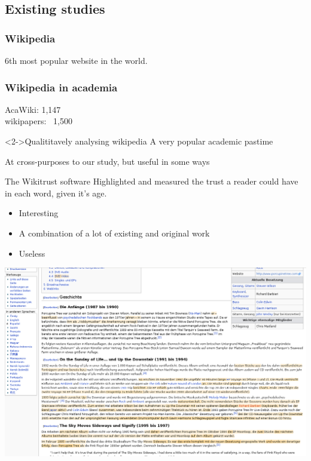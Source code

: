 \documentclass[t]{beamer}
\begin{document}
  \subsection{Existing studies}

  \begin{frame}
    \frametitle{Wikipedia} 

    6th most popular website in the world.\cite{Alexa-about2014}
  \end{frame}


  \begin{frame}
    \frametitle{Wikipedia in academia}
    AcaWiki: 1,147\\
    wikipapers: ~1,500
    
    \begin{block}<2->{Qualititavely analysing wikipedia}
      A very popular academic pastime

      At cross-purposes to our study, but useful in some ways

    \end{block}

  \end{frame}


  \begin{frame}{The Wikitrust software}
    Highlighted and measured the trust a reader could have in each
    word, given it's age.

    \begin{itemize}
    \item <2-> Interesting
    \item <3-> A combination of a lot of existing and original work
    \item <4-> Useless \cite{Lucassen2011}
    \end{itemize}
    
    \includegraphics[clip=true,resolution=600]{../finl/img/wikitrust.png}

  \end{frame}
\end{document}
